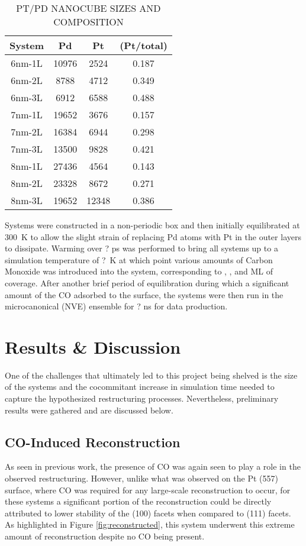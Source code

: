 \begin{table}
  \caption{PT/PD NANOCUBE SIZES AND COMPOSITION}
  \centering
  \begin{threeparttable}
  \begin{tabular}{ c ccc }
  \hline
  \hline
  \textbf{System} & \textbf{Pd} & \textbf{Pt} &  \textbf{(Pt/total)} \\
  \hline
  6nm-1L & 10976 & 2524  & 0.187 \\
  6nm-2L & 8788  & 4712  & 0.349 \\
  6nm-3L & 6912  & 6588  & 0.488 \\
  7nm-1L & 19652 & 3676  & 0.157 \\
  7nm-2L & 16384 & 6944  & 0.298 \\
  7nm-3L & 13500 & 9828  & 0.421 \\
  8nm-1L & 27436 & 4564  & 0.143 \\
  8nm-2L & 23328 & 8672  & 0.271 \\
  8nm-3L & 19652 & 12348 & 0.386 \\
  \hline
  \hline
  \end{tabular}
  \end{threeparttable}
\label{tab:systems}
\end{table}

Systems were constructed in a non-periodic box and then initially equilibrated
at 300~K to allow the slight strain of replacing Pd atoms with Pt in the outer
layers to dissipate. Warming over ? ps was performed to bring all systems up to
a simulation temperature of ?~K at which point various amounts of Carbon
Monoxide was introduced into the system, corresponding to , , and ML of
coverage. After another brief period of equilibration during which a
significant amount of the CO adsorbed to the surface, the systems were then run
in the microcanonical (NVE) ensemble for ? ns for data production.

\section{Results \& Discussion}
One of the challenges that ultimately led to this project being shelved is the
size of the systems and the cocommitant increase in simulation time needed to
capture the hypothesized restructuring processes. Nevertheless, preliminary
results were gathered and are discussed below.

\subsection{CO-Induced Reconstruction}
As seen in previous work\citep{Michalka:2013aa}, the presence of CO was again seen to play a
role in the observed restructuring. However, unlike what was observed on the Pt
(557) surface\citep{Michalka:2013aa}, where CO was required for any large-scale reconstruction
to occur, for these systems a significant portion of the reconstruction could
be directly attributed to lower stability of the (100) facets when compared to
(111) facets. As highlighted in Figure \ref{fig:reconstructed}, this system
underwent this extreme amount of reconstruction despite no CO being present. 

